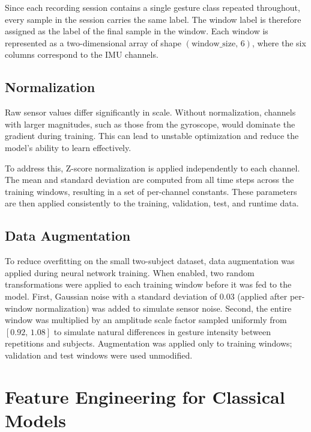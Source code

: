 Since each recording session contains a single gesture class repeated throughout, every sample in the session carries the same label. The window label is therefore assigned as the label of the final sample in the window. Each window is represented as a two-dimensional array of shape $(\text{window\_size},\, 6)$, where the six columns correspond to the IMU channels.
 
\subsection{Normalization}
Raw sensor values differ significantly in scale. Without normalization, channels with larger magnitudes, such as those from the gyroscope, would dominate the gradient during training. This can lead to unstable optimization and reduce the model’s ability to learn effectively.

To address this, Z-score normalization is applied independently to each channel. The mean and standard deviation are computed from all time steps across the training windows, resulting in a set of per-channel constants. These parameters are then applied consistently to the training, validation, test, and runtime data.

\subsection{Data Augmentation}
 
To reduce overfitting on the small two-subject dataset, data augmentation was applied during neural network training. When enabled, two random transformations were applied to each training window before it was fed to the model. First, Gaussian noise with a standard deviation of 0.03 (applied after per-window normalization) was added to simulate sensor noise. Second, the entire window was multiplied by an amplitude scale factor sampled uniformly from $[0.92,\,1.08]$ to simulate natural differences in gesture intensity between repetitions and subjects. Augmentation was applied only to training windows; validation and test windows were used unmodified.

\section{Feature Engineering for Classical Models}
\label{sec:features}
 
